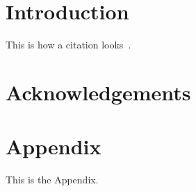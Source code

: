 \documentclass{article}
\begin{document}

\begin{abstract}
  ...
\end{abstract}

\section{Introduction}
\label{sec:introduction}

This is how a citation looks~\cite{douillard2023diloco}.

\section*{Acknowledgements}
\label{sec:acknowledgements}




\newpage
\appendix
\onecolumn

\section{Appendix}

This is the Appendix.
\end{document}
